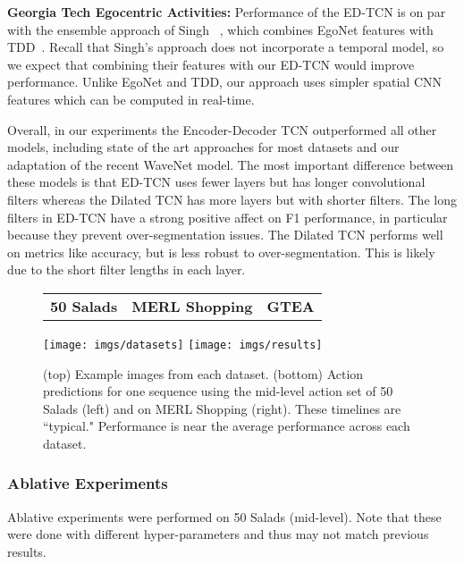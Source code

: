 \documentclass[10pt,twocolumn,letterpaper]{article}
\newcommand{\fakesubsection}[1]{\smallskip\noindent\textbf{#1:}}
\begin{document}
\fakesubsection{Georgia Tech Egocentric Activities}
Performance of the ED-TCN is on par with the ensemble approach of Singh \etal~\cite{singh_cvpr_2016_ego}, which combines EgoNet features with TDD~\cite{TDD}. 
Recall that Singh's approach does not incorporate a temporal model, so we expect that combining their features with our ED-TCN would improve performance. 
Unlike EgoNet and TDD, our approach uses simpler spatial CNN features which can be computed in real-time.

Overall, in our experiments the Encoder-Decoder TCN outperformed all other models, including state of the art approaches for most datasets and our adaptation of the recent WaveNet model. 
The most important difference between these models is that ED-TCN uses fewer layers but has longer convolutional filters whereas the Dilated TCN has more layers but with shorter filters. 
The long filters in ED-TCN have a strong positive affect on F1 performance, in particular because they prevent over-segmentation issues. 
The Dilated TCN performs well on metrics like accuracy, but is less robust to over-segmentation. This is likely due to the short filter lengths in each layer.







\begin{figure*}
	\center
		\begin{tabular}{ c  c  c }
\hspace{.13\hsize}	\textbf{50 Salads} \hspace{.08\hsize} & \hspace{.08\hsize} \textbf{MERL Shopping} \hspace{.08\hsize} & \hspace{.08\hsize} \textbf{GTEA} \hspace{.17\hsize}
\end{tabular}    
   	\texttt{[image: imgs/datasets]}
\texttt{[image: imgs/results]}   
	\linebreak

	\caption{(top) Example images from each dataset. (bottom) Action predictions for one sequence using the mid-level action set of 50 Salads (left) and on MERL Shopping (right). These timelines are ``typical." Performance is near the average performance across each dataset.}
	\label{fig:timelines}
\end{figure*}


\subsubsection{Ablative Experiments}
Ablative experiments were performed on 50 Salads (mid-level). Note that these were done with different hyper-parameters and thus may not match previous results. 
\end{document}
